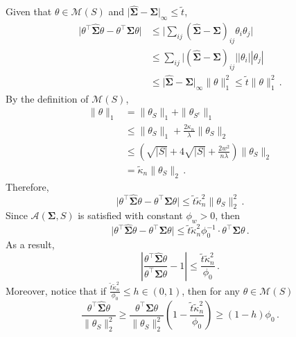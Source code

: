\documentclass[11pt]{article}
\renewcommand{\hat}{\widehat}
\newcommand{\bSigma}{\boldsymbol{\Sigma}}
\begin{document}
    Given that $\theta \in \mathcal{M}(S)$ and $\big|\hat{\bSigma}-\bSigma\big|_\infty \leq \tilde{t}$,
    \begin{align*}
        \big|\theta^\top \hat{\bSigma}\theta - \theta^\top \bSigma\theta\big| &\leq \big|\sum_{ij}(\hat{\bSigma}-\bSigma)_{ij}\theta_i \theta_j \big| \\
        &\le \sum_{ij} \big|(\hat{\bSigma}-\bSigma)_{ij}\big| |\theta_i| |\theta_j|\\
        &\le \big|\hat{\bSigma}-\bSigma\big|_\infty \|\theta\|_1^2 \leq \tilde{t}\|\theta\|_1^2\,.
    \end{align*}
    By the definition of $\mathcal{M}(S)$, 
    \begin{align*}
        \|\theta\|_1 &=  \|\theta_S\|_1+\|\theta_{S^c}\|_1\\
            &\leq  \|\theta_S\|_1+\frac{2\kappa_n}{\lambda}\|\theta_S\|_2\\
            &\leq  (\sqrt{|S|}+4\sqrt{|S|}+\frac{2w^2}{n\lambda})\|\theta_S\|_2\\
            &=  \tilde{\kappa}_n\|\theta_S\|_2\,.
    \end{align*}
    Therefore,
    \[\big|\theta^\top \hat{\bSigma}\theta - \theta^\top \bSigma\theta\big|\leq \tilde{t}\tilde{\kappa}_n^2\|\theta_S\|_2^2\,.\]
    Since $\mathcal{A}(\bSigma,S)$ is satisfied with constant $\phi_w>0$, then 
    \[\big|\theta^\top \hat{\bSigma}\theta - \theta^\top \bSigma\theta\big|\leq \tilde{t}\tilde{\kappa}_n^2\phi_0^{-1}\cdot \theta^\top \bSigma \theta\,.\]
    As a result,
    \[\left|\frac{\theta^\top \hat{\bSigma}\theta}{\theta^\top \bSigma\theta}-1\right|\leq \frac{\tilde{t}\tilde{\kappa}_n^2}{\phi_0}\,.\]
    Moreover, notice that if $\frac{\tilde{t}\tilde{\kappa}_n^2}{\phi_0}\leq h\in(0,1)$, then for any $\theta\in \mathcal{M}(S)$
    \[        \frac{\theta^\top\hat{\bSigma}\theta}{\|\theta_S\|_2^2}\geq \frac{\theta^\top \bSigma\theta}{\|\theta_S\|_2^2}\left(1-\frac{\tilde{t}\tilde{\kappa}_n^2}{\phi_0}\right)\geq (1-h)\phi_0\,.
\]
\end{document}
